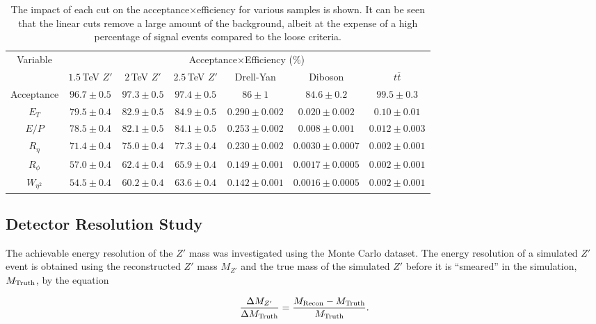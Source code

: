 \documentclass{article}
\begin{document}
\begin{table}[h!t]
\centering
\caption{The impact of each cut on the acceptance$\times$efficiency for various samples is shown. It can be seen that the linear cuts remove a large amount of the background, albeit at the expense of a high percentage of signal events compared to the loose criteria. \label{table:linearCutEfficiencies}}
\begin{tabular}{|c|c|c|c|c|c|c| } 
\hline
\multirow{2}{*}{Variable} & \multicolumn{6}{|c|}{Acceptance$\times$Efficiency ($\%$)}\\\cline{2-7}
& $1.5\,$TeV $Z'$ & $2\,$TeV $Z'$ & $2.5\,$TeV $Z'$ & Drell-Yan & Diboson & $t\overline{t}$ \\\hline
Acceptance  & $96.7\pm0.5$ & $97.3\pm0.5$ & $97.4\pm0.5$ & $86\pm1$ & $84.6\pm0.2$ & $99.5\pm0.3$\\\hline
$E_T$ & $79.5\pm0.4$ & $82.9\pm0.5$ & $84.9\pm0.5$ & $0.290\pm0.002$ & $0.020\pm0.002$ & $0.10\pm0.01$\\\hline
$E/P$ &  $78.5\pm0.4$ & $82.1\pm0.5$ & $84.1\pm0.5$ & $0.253\pm0.002$ & $0.008\pm0.001$ & $0.012\pm0.003$ \\\hline
$R_{\eta}$ &  $71.4\pm0.4$ & $75.0\pm0.4$ & $77.3\pm0.4$ & $0.230\pm0.002$ & $0.0030\pm0.0007$ & $0.002\pm0.001$\\\hline
$R_{\phi}$ & $57.0\pm0.4$ & $62.4\pm0.4$ & $65.9\pm0.4$ & $0.149\pm0.001$ & $0.0017\pm0.0005$ & $0.002\pm0.001$\\\hline
$W_{\eta^2}$ & $54.5\pm0.4$ & $60.2\pm0.4$ & $63.6\pm0.4$ & $0.142\pm0.001$ & $0.0016\pm0.0005$ & $0.002\pm0.001$ \\\hline
\end{tabular}
\end{table}


\subsection{Detector Resolution Study}


The achievable energy resolution of the $Z'$ mass was investigated using the Monte Carlo dataset. The energy resolution of a simulated $Z'$ event is obtained using the reconstructed $Z'$ mass $M_{Z'}$ and the true mass of the simulated $Z'$ before it is ``smeared'' in the simulation, $M_{\rm{Truth}}$, by the equation

\begin{equation}
\frac{\Delta M_{Z'}}{\Delta M_{\rm{Truth}}} = \frac{M_{\rm{Recon}}-M_{\rm{Truth}}}{M_{\rm{Truth}}}.
\end{equation}
\end{document}
